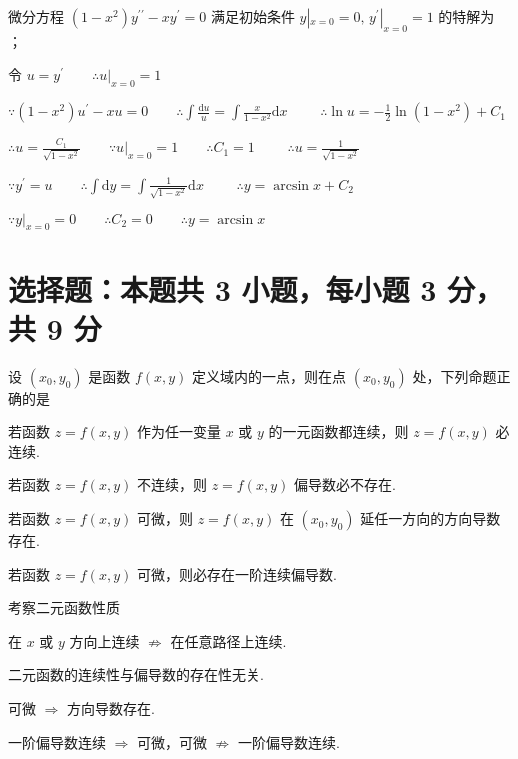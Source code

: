 \begin{question}[points = 3]
    微分方程 $(1 - x^2)y^{\prime\prime} - xy^{\prime} = 0$ 满足初始条件
    $y|_{x = 0} = 0,\, y^{\prime}|_{x = 0} = 1$ 的特解为 \fillin[$y = \arcsin{x}$]；
\end{question}
\begin{solution}
    令 $u = y^{\prime} \qquad \therefore u|_{x = 0} = 1$

    $\because (1 - x^2)u^{\prime} - xu = 0 \qquad \therefore \int \frac{\mathrm{d}u}{u} = \int \frac{x}{1 - x^2}\mathrm{d}x \qquad$
    $\therefore \ln{u} = -\frac{1}{2}\ln{(1 - x^2)} + C_1$

    $\therefore u = \frac{C_1}{\sqrt{1 - x^2}} \qquad \because u|_{x = 0} = 1 \qquad \therefore C_1 = 1 \qquad$
    $\therefore u = \frac{1}{\sqrt{1 - x^2}}$

    $\because y^{\prime} = u \qquad \therefore \int \mathrm{d}y = \int \frac{1}{\sqrt{1 - x^2}}\mathrm{d}x \qquad$
    $\therefore y = \arcsin{x} + C_2$

    $\because y|_{x = 0} = 0 \qquad \therefore C_2 = 0 \qquad \therefore y = \arcsin{x}$
\end{solution}

\section{选择题：本题共 3 小题，每小题 3 分，共 9 分}

\begin{question}[points = 3]
    设 $(x_0, y_0)$ 是函数 $f(x, y)$ 定义域内的一点，则在点 $(x_0, y_0)$ 处，下列命题正确的是 \paren[C]
\end{question}
\begin{choices}
    \item 若函数 $z = f(x, y)$ 作为任一变量 $x$ 或 $y$ 的一元函数都连续，则 $z = f(x, y)$ 必连续.
    \item 若函数 $z = f(x, y)$ 不连续，则 $z = f(x, y)$ 偏导数必不存在.
    \item 若函数 $z = f(x, y)$ 可微，则 $z = f(x, y)$ 在 $(x_0, y_0)$ 延任一方向的方向导数存在.
    \item 若函数 $z = f(x, y)$ 可微，则必存在一阶连续偏导数.
\end{choices}
\begin{solution}
    考察二元函数性质
    \begin{choices}
        \item 在 $x$ 或 $y$ 方向上连续 $\nRightarrow$ 在任意路径上连续.
        \item 二元函数的连续性与偏导数的存在性无关.
        \item 可微 $\Rightarrow$ 方向导数存在.
        \item 一阶偏导数连续 $\Rightarrow$ 可微，可微 $\nRightarrow$ 一阶偏导数连续.
    \end{choices}
\end{solution}

